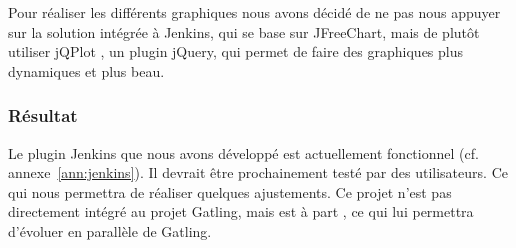 Pour réaliser les différents graphiques nous avons décidé de ne pas nous appuyer sur la solution intégrée à Jenkins, qui se base sur JFreeChart, mais de plutôt utiliser jQPlot \cite{jqplot}, un plugin jQuery, qui permet de faire des graphiques plus dynamiques et plus beau.

\subsubsection{Résultat}

Le plugin Jenkins que nous avons développé est actuellement fonctionnel (cf. annexe~\ref{ann:jenkins}). Il devrait être prochainement testé par des utilisateurs. Ce qui nous permettra de réaliser quelques ajustements. Ce projet n'est pas directement intégré au projet Gatling, mais est à part \cite{gatlingplugin}, ce qui lui permettra d'évoluer en parallèle de Gatling. 